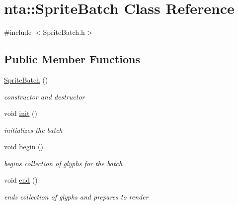 \hypertarget{classnta_1_1SpriteBatch}{}\section{nta\+:\+:Sprite\+Batch Class Reference}
\label{classnta_1_1SpriteBatch}


{\ttfamily \#include $<$Sprite\+Batch.\+h$>$}

\subsection*{Public Member Functions}
\begin{DoxyCompactItemize}
\item 
\mbox{\label{classnta_1_1SpriteBatch_a554ec4ee678b6f97621d299e4a258f95}} 
\hyperlink{classnta_1_1SpriteBatch_a554ec4ee678b6f97621d299e4a258f95}{Sprite\+Batch} ()
\begin{DoxyCompactList}\small\item\em constructor and destructor \end{DoxyCompactList}\item 
\mbox{\label{classnta_1_1SpriteBatch_a91cb54c5e459f9cb0142f7d4b6e3272c}} 
void \hyperlink{classnta_1_1SpriteBatch_a91cb54c5e459f9cb0142f7d4b6e3272c}{init} ()
\begin{DoxyCompactList}\small\item\em initializes the batch \end{DoxyCompactList}\item 
\mbox{\label{classnta_1_1SpriteBatch_a8ceff37f4b281bfb1f627876bb420978}} 
void \hyperlink{classnta_1_1SpriteBatch_a8ceff37f4b281bfb1f627876bb420978}{begin} ()
\begin{DoxyCompactList}\small\item\em begins collection of glyphs for the batch \end{DoxyCompactList}\item 
\mbox{\label{classnta_1_1SpriteBatch_abadacd5bfcfc6ed0cf5a4470a22010ed}} 
void \hyperlink{classnta_1_1SpriteBatch_abadacd5bfcfc6ed0cf5a4470a22010ed}{end} ()
\begin{DoxyCompactList}\small\item\em ends collection of glyphs and prepares to render \end{DoxyCompactList}\item 

\end{DoxyCompactItemize}
